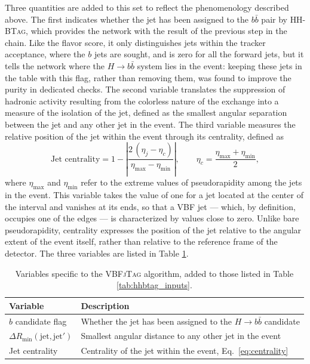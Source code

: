Three quantities are added to this set to reflect the phenomenology described above. The first indicates whether the jet has been assigned to the $b\bar{b}$ pair by \textsc{HH-BTag}, which provides the network with the result of the previous step in the chain. Like the flavor score, it only distinguishes jets within the tracker acceptance, where the $b$ jets are sought, and is zero for all the forward jets, but it tells the network where the $H\to b\bar{b}$ system lies in the event: keeping these jets in the table with this flag, rather than removing them, was found to improve the purity in dedicated checks. The second variable translates the suppression of hadronic activity resulting from the colorless nature of the exchange into a measure of the isolation of the jet, defined as the smallest angular separation between the jet and any other jet in the event. The third variable measures the relative position of the jet within the event through its centrality, defined as
%
\begin{equation}
\text{Jet centrality} = 1 - \left| \frac{2\,(\eta_j - \eta_c)}{\eta_{\max} - \eta_{\min}} \right| ,
\qquad \eta_c = \frac{\eta_{\max} + \eta_{\min}}{2},
\label{eq:centrality}
\end{equation}
%
where $\eta_{\max}$ and $\eta_{\min}$ refer to the extreme values of pseudorapidity among the jets in the event. This variable takes the value of one for a jet located at the center of the interval and vanishes at its ends, so that a VBF jet — which, by definition, occupies one of the edges — is characterized by values close to zero. Unlike bare pseudorapidity, centrality expresses the position of the jet relative to the angular extent of the event itself, rather than relative to the reference frame of the detector. The three variables are listed in Table \ref{tab:vbfjtag_inputs}.
\begin{table}[t]
\centering
\small
\begin{tabular}{ll}
\toprule
Variable & Description \\
\midrule
$b$ candidate flag             & Whether the jet has been assigned to the $H\rightarrow b\bar{b}$ candidate \\
$\Delta R_\text{min}(\text{jet}, \text{jet}')$            & Smallest angular distance to any other jet in the event \\
Jet centrality              & Centrality of the jet within the event, Eq.\ \ref{eq:centrality} \\
\bottomrule
\end{tabular}
\caption{Variables specific to the \textsc{VBFjTag} algorithm, added to those listed in Table \ref{tab:hhbtag_inputs}.}
\label{tab:vbfjtag_inputs}
\end{table}
%

